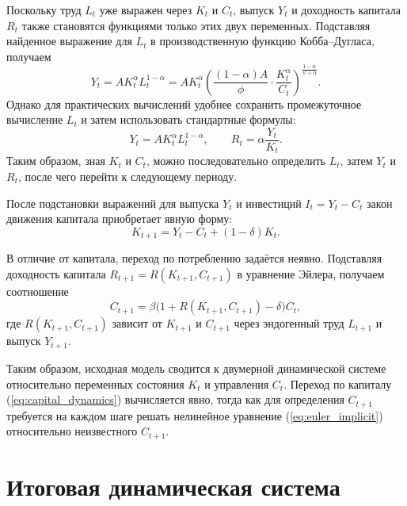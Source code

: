 \documentclass[12pt,a4paper]{report}   %
\begin{document}
            Поскольку труд $L_t$ уже выражен через $K_t$ и $C_t$, выпуск $Y_t$ и доходность капитала $R_t$ также становятся функциями только этих двух переменных. Подставляя найденное выражение для $L_t$ в производственную функцию Кобба--Дугласа, получаем
            \begin{equation}
            Y_t = A K_t^{\alpha} L_t^{1-\alpha} = A K_t^{\alpha} 
            \left( \frac{(1-\alpha)A}{\phi} \cdot \frac{K_t^{\alpha}}{C_t} \right)^{\frac{1-\alpha}{\psi+\alpha}}.
            \end{equation}
            Однако для практических вычислений удобнее сохранить промежуточное вычисление $L_t$ и затем использовать стандартные формулы:
            \begin{equation}
            Y_t = A K_t^{\alpha} L_t^{1-\alpha}, \qquad
            R_t = \alpha \frac{Y_t}{K_t}.
            \end{equation}
            Таким образом, зная $K_t$ и $C_t$, можно последовательно определить $L_t$, затем $Y_t$ и $R_t$, после чего перейти к следующему периоду.

            После подстановки выражений для выпуска $Y_t$ и инвестиций $I_t = Y_t - C_t$ закон движения капитала приобретает явную форму:
            \begin{equation}
            K_{t+1} = Y_t - C_t + (1-\delta)K_t. \label{eq:capital_dynamics}
            \end{equation}

            В отличие от капитала, переход по потреблению задаётся неявно. Подставляя доходность капитала $R_{t+1} = R(K_{t+1}, C_{t+1})$ в уравнение Эйлера, получаем соотношение
            \begin{equation}
            C_{t+1} = \beta \bigl(1 + R(K_{t+1}, C_{t+1}) - \delta \bigr) C_t, \label{eq:euler_implicit}
            \end{equation}
            где $R(K_{t+1}, C_{t+1})$ зависит от $K_{t+1}$ и $C_{t+1}$ через эндогенный труд $L_{t+1}$ и выпуск $Y_{t+1}$.

            Таким образом, исходная модель сводится к двумерной динамической системе относительно переменных состояния $K_t$ и управления $C_t$. Переход по капиталу (\ref{eq:capital_dynamics}) вычисляется явно, тогда как для определения $C_{t+1}$ требуется на каждом шаге решать нелинейное уравнение (\ref{eq:euler_implicit}) относительно неизвестного $C_{t+1}$.
        \section{Итоговая динамическая система}
\end{document}
